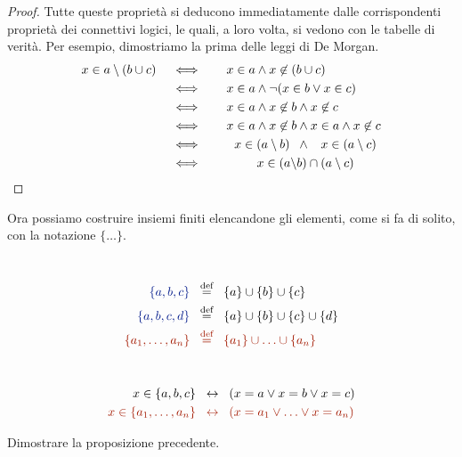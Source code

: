 \begin{proof}
	Tutte queste propriet\`a si deducono immediatamente dalle corrispondenti propriet\`a dei connettivi logici, le quali, a loro volta, si vedono con le tabelle di verit\`a. Per esempio, dimostriamo 
	la prima delle leggi di De Morgan.
\begin{alignat*}{2}
		x \in a \setminus (b \cup c) &\quad\iff\quad & \mathrlap{x \in a \land x \not\in (b \cup c)}\phantom{x \in a \land x \not\in b} &\\
		&\quad\iff & \mathrlap{x \in a \land \neg(x \in b \lor x \in c)}\phantom{x \in a \land x \not\in b} &\\
		&\quad\iff & x \in a \land x \not\in b &\land x \not\in c\\
		&\quad\iff & x \in a \land x \not\in b &\land x \in a \land x \not\in c\\
		&\quad\iff & x \in (a \setminus b)\;\; &\land\;\;\; x \in (a \setminus c)\\
		&\quad\iff & x \in (a \setminus &b) \cap (a \setminus c)
\end{alignat*}
\end{proof}

Ora possiamo costruire insiemi finiti elencandone gli elementi, come si fa di solito, con la notazione $\{\ldots\}$.

\begin{notation}
\ 
\baselineskip
	\begin{align*}
	   {\drkblu \{a,b,c\}} &\;\;\Mydef\;\; \{a\} \cup \{b\} \cup \{c\} \\
	   {\drkblu \{a,b,c,d\}} &\;\;\Mydef\;\; \{a\} \cup \{b\} \cup \{c\} \cup \{d\} \\
	   \drkred \{a_1,\ldots,a_n\} &\drkred\;\;\Mydef\;\; \{a_1\} \cup \ldots \cup \{a_n\}
	\end{align*}
\end{notation}

\begin{proposition}
\ 
\baselineskip
	\begin{align*}
		x \in \{a,b,c\} & \;\;\leftrightarrow\;\; (x = a \lor x = b \lor x = c) \\
	    \drkred x \in \{a_1,\ldots,a_n\} &\drkred \;\;\leftrightarrow\;\; (x = a_1 \lor \ldots \lor x = a_n) 
	\end{align*}
\end{proposition}

\begin{exercise}
	Dimostrare la proposizione precedente.
\end{exercise}

